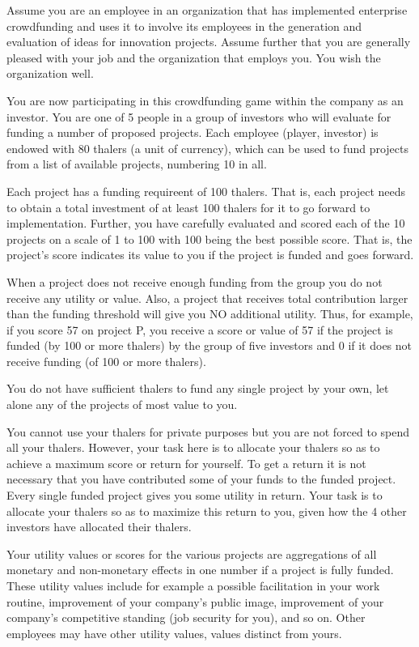 \documentclass[11pt, oneside]{article}   	%
\begin{document}
Assume you are an employee in an organization that has implemented enterprise crowdfunding and uses it to involve its employees in the generation and evaluation of ideas for innovation projects. Assume further that you are generally pleased with your job and the organization that employs you. You wish the organization well.

You are now participating in this crowdfunding game within the company as an investor. You are one of 5 people in a group of investors who will evaluate for funding a number of proposed projects. Each employee (player, investor) is endowed with 80 thalers (a unit of currency), which can be used to fund projects from a list of available projects, numbering 10 in all.

Each project has  a funding requireent of 100 thalers. That is, each project needs to obtain a total   investment of at least 100 thalers for it to go forward to implementation. Further, you have carefully evaluated and scored each of the 10 projects on a scale of 1 to 100 with 100 being the best possible score. That is, the project's score indicates its value to you if the project is funded and goes forward.

When a project does not receive enough funding from the group you do not receive any utility or value. Also,  a project that receives total contribution larger  than the funding threshold will give you NO additional utility. Thus, for example, if you score 57 on project P, you receive a score or value of 57 if the project is funded (by 100 or more thalers) by the group of five investors and 0 if it does not receive funding (of 100 or more thalers). 

You do not have sufficient thalers to fund any single project by your own, let alone any of the projects of most value to you.

You cannot use your thalers for private purposes but you are not forced to spend all your thalers. However, your task here is to allocate your thalers so as to achieve a maximum score  or return for yourself. To get a return it is not necessary that you have contributed some of your funds to the funded project. Every single funded project gives you some utility in return. Your task is to allocate your thalers so as to maximize this return to you, given how the 4 other investors have allocated their thalers.

Your  utility values or scores for the various projects are  aggregations of all monetary and non-monetary effects in one number if a project is fully funded. These utility values include for example a possible facilitation in your work routine, improvement of your company's public image, improvement of your company's competitive standing (job security for you), and so on. Other employees may have other utility values, values distinct from yours.
\end{document}
